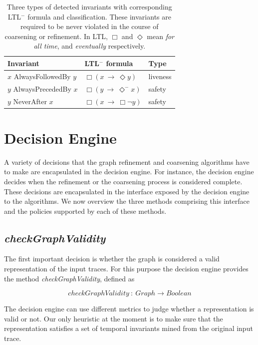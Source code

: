 \begin{table}[!t]
\begin{tabular}{lll}
  \textbf{Invariant} & \textbf{LTL$^-$ formula} & \textbf{Type}\\
\hline
  $x$ AlwaysFollowedBy $y$ & $\Box(x~\rightarrow~\Diamond{y})$ & liveness\\
  $y$ AlwaysPrecededBy $x$ & $\Box(y~\rightarrow~\Diamond^-{x})$ & safety\\
  $y$ NeverAfter $x$ & $\Box(x~\rightarrow~\Box{\neg{y}})$ & safety\\
\end{tabular}

\caption{Three types of detected invariants with corresponding LTL$^-$
  formula and classification. These invariants are required to be never violated
  in the course of coarsening or refinement. In LTL, $\Box$ and
  $\Diamond$ mean \emph{for all time}, and \emph{eventually}
  respectively.}

\label{table:invariants}
\end{table}


\section{Decision Engine}
\label{sec:decision_engine}

A variety of decisions that the graph refinement and coarsening
algorithms have to make are encapsulated in the decision engine. For
instance, the decision engine decides when the refinement or the
coarsening process is considered complete. These decisions are
encapsulated in the interface exposed by the decision engine to the
algorithms. We now overview the three methods comprising this
interface and the policies supported by each of these methods.

\subsection{\textit{checkGraphValidity}}

The first important decision is whether the graph is considered a
valid representation of the input traces. For this purpose the
decision engine provides the method \emph{checkGraphValidity}, defined
as

$$
checkGraphValidity~:~Graph\rightarrow{Boolean}
$$

The decision engine can use different metrics to judge whether a
representation is valid or not. Our only heuristic at the moment is to
make sure that the representation satisfies a set of temporal
invariants mined from the original input trace.

